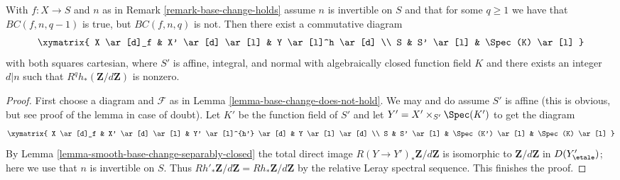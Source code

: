 \begin{lemma}
\label{lemma-base-change-does-not-hold-post}
With $f : X \to S$ and $n$ as in Remark \ref{remark-base-change-holds}
assume $n$ is invertible on $S$ and that for some $q \geq 1$
we have that $BC(f, n, q - 1)$ is true, but $BC(f, n, q)$ is not.
Then there exist a commutative diagram
$$
\xymatrix{
X \ar[d]_f & X' \ar[d] \ar[l] & Y \ar[l]^h \ar[d] \\
S & S' \ar[l] & \Spec(K) \ar[l]
}
$$
with both squares cartesian, where $S'$ is affine, integral, and normal
with algebraically closed function field $K$ and there exists an integer
$d | n$ such that $R^qh_*(\mathbf{Z}/d\mathbf{Z})$ is nonzero.
\end{lemma}

\begin{proof}
First choose a diagram and $\mathcal{F}$ as in
Lemma \ref{lemma-base-change-does-not-hold}.
We may and do assume $S'$ is affine (this is obvious, but
see proof of the lemma in case of doubt).
Let $K'$ be the function field of $S'$
and let $Y' = X' \times_{S'} \Spec(K')$ to get the diagram
$$
\xymatrix{
X \ar[d]_f &
X' \ar[d] \ar[l] &
Y' \ar[l]^{h'} \ar[d] &
Y \ar[l] \ar[d] \\
S &
S' \ar[l] &
\Spec(K') \ar[l] &
\Spec(K) \ar[l]
}
$$
By Lemma \ref{lemma-smooth-base-change-separably-closed}
the total direct image $R(Y \to Y')_*\mathbf{Z}/d\mathbf{Z}$
is isomorphic to $\mathbf{Z}/d\mathbf{Z}$ in $D(Y'_\etale)$; here
we use that $n$ is invertible on $S$.
Thus $Rh'_*\mathbf{Z}/d\mathbf{Z} = Rh_*\mathbf{Z}/d\mathbf{Z}$
by the relative Leray spectral sequence. This finishes the proof.
\end{proof}
